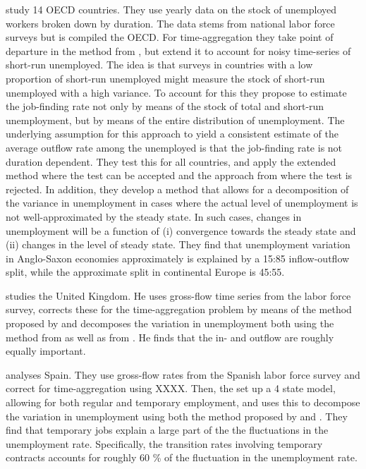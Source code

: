 \cite{Elsby2013} study 14 OECD countries. They use yearly data on the stock of unemployed workers broken down by duration. The data stems from national labor force surveys but is compiled the OECD. For time-aggregation they take point of departure in the method  from \cite{Shimer2012}, but extend it to account for noisy time-series of short-run unemployed. The idea is that surveys in countries with a low proportion of short-run unemployed might measure the stock of short-run unemployed with a high variance. To account for this they propose to estimate the job-finding rate not only by means of the stock of total and short-run unemployment, but by means of the entire distribution of unemployment. The underlying assumption for this approach to yield a consistent estimate of the average outflow rate among the unemployed is that the job-finding rate is not duration dependent. They test this for all countries, and apply the extended method where the test can be accepted and the approach from \cite{Shimer2012} where the test is rejected. In addition, they develop a method that allows for a decomposition of the variance in unemployment in cases where the actual level of unemployment is not well-approximated by the steady state. In such cases, changes in unemployment will be a function of (i) convergence towards the steady state and (ii) changes in the level of steady state. They find that unemployment variation in Anglo-Saxon economies approximately is explained by a 15:85 inflow-outflow split, while the approximate split in continental Europe is 45:55.

\cite{Gomes2012} studies the United Kingdom. He uses gross-flow time series from the labor force survey, corrects these for the time-aggregation problem by means of the method proposed by \cite{Shimer2012} and decomposes the variation in unemployment both using the method from \cite{Shimer2012} as well as from \cite{Fujita2008}. He finds that the in- and outflow are roughly equally important. 

\cite{Silva2013} analyses Spain. They use gross-flow rates from the Spanish labor force survey and correct for time-aggregation using XXXX. Then, the set up a 4 state model, allowing for both regular and temporary employment, and uses this to decompose the variation in unemployment using both the method proposed by \cite{Shimer2012} and \cite{Fujita2009}. They find that temporary jobs explain a large part of the the fluctuations in the unemployment rate. Specifically, the transition rates involving temporary contracts accounts for roughly 60 \% of the fluctuation in the unemployment rate.